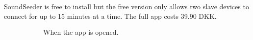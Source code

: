 SoundSeeder is free to install but the free version only allows two slave devices to connect for up to 15 minutes at a time.
The full app costs 39.90 DKK.

\begin{figure}[h!]
    \centering
    \begin{subfigure}[b]{0.45\textwidth}
        \footnotesize
        \centering
        \caption{When the app is opened.}\label{fig:soundseeder_screenshot}
    \end{subfigure}
    \hfill
    \begin{subfigure}[b]{0.45\textwidth}
        \footnotesize
        \centering

\end{subfigure}
\end{figure}
